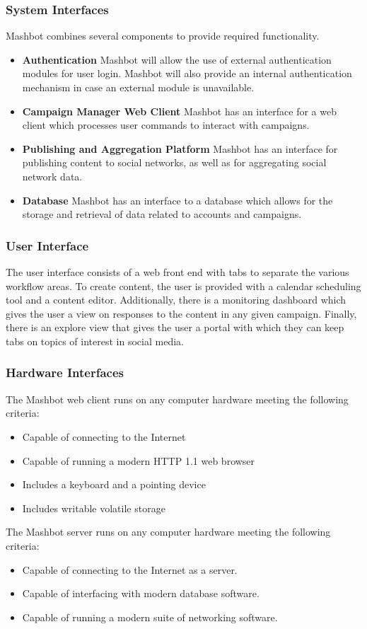 \documentclass{report}
\begin{document}
\subsubsection{System Interfaces} %
Mashbot combines several components to provide required functionality.
\begin{itemize}
\item \textbf{Authentication} Mashbot will allow the use of external
  authentication modules for user login. Mashbot will also provide an
  internal authentication mechanism in case an external module is
  unavailable.
\item \textbf{Campaign Manager Web Client} Mashbot has an interface
  for a web client which processes user commands to interact with
  campaigns.
\item \textbf{Publishing and Aggregation Platform} Mashbot has an
  interface for publishing content to social networks, as well as for
  aggregating social network data.
\item \textbf{Database} Mashbot has an interface to a database which
  allows for the storage and retrieval of data related to accounts and
  campaigns.
\end{itemize}
\subsubsection{User Interface} %
The user interface consists of a web front end with tabs to separate
the various workflow areas. To create content, the user is provided
with a calendar scheduling tool and a content editor.  Additionally,
there is a monitoring dashboard which gives the user a view on
responses to the content in any given campaign.  Finally, there is an
explore view that gives the user a portal with which they can keep
tabs on topics of interest in social media.
\subsubsection{Hardware Interfaces} %
The Mashbot web client runs on any computer hardware meeting the
following criteria:
\begin{itemize}
\item Capable of connecting to the Internet
\item Capable of running a modern HTTP 1.1 web browser
\item Includes a keyboard and a pointing device
\item Includes writable volatile storage
\end{itemize}
The Mashbot server runs on any computer hardware meeting
the following criteria:
\begin{itemize}
\item Capable of connecting to the Internet as a server.
\item Capable of interfacing with modern database software.
\item Capable of running a modern suite of networking software.
\end{itemize}
\end{document}
